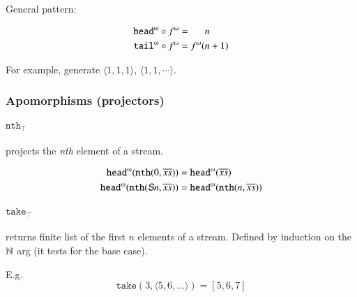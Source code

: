 General pattern:

\begin{alignat}{2}
  \cohead\circ\Lift{f}{\omega} &= \phantom{\Lift{f}{\omega}(}n \\
  \cotail\circ\Lift{f}{\omega} &= \Lift{f}{\omega}(n+1)
\end{alignat}


For example, generate \(\langle 1,1,1\rangle\), \(\langle 1,1,\cdots\rangle\).

\subsubsection{Apomorphisms (projectors)}

\paragraph{\(\texttt{nth}_{\scriptscriptstyle\top}\)}
projects the \textit{nth} element of a stream.

\begin{prooftree}
\end{prooftree}

\begin{align} %
  \cohead(\texttt{nth}(0,\coseq{x})) &= \cohead(\coseq{x}) \\
  \cohead(\texttt{nth}(\SNat{}n,\coseq{x})) &= \cohead(\texttt{nth}(n,\coseq{x}))
\end{align} %

\paragraph{\(\texttt{take}_{\scriptscriptstyle\top}\)}
returns finite list of the first \(n\) elements of a stream. Defined
by induction on the \(\Nat\) arg (it tests for the base case).

E.g.
\[\texttt{take}(3, \langle 5,6,\ldots\rangle) = [5,6,7]\]

